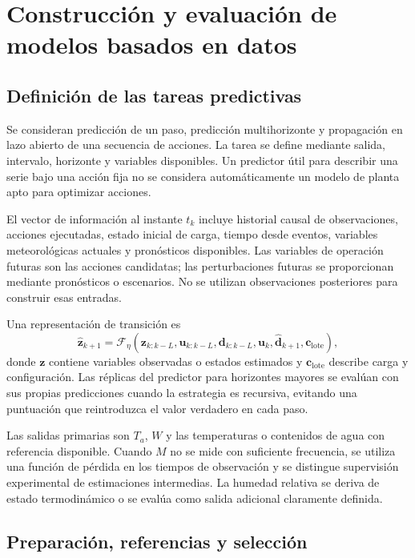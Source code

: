 \section{Construcción y evaluación de modelos basados en datos}
\label{met:ml}

\subsection{Definición de las tareas predictivas}

Se consideran predicción de un paso, predicción multihorizonte y propagación en lazo abierto de una secuencia de acciones. La tarea se define mediante salida, intervalo, horizonte y variables disponibles. Un predictor útil para describir una serie bajo una acción fija no se considera automáticamente un modelo de planta apto para optimizar acciones.

El vector de información al instante $t_k$ incluye historial causal de observaciones, acciones ejecutadas, estado inicial de carga, tiempo desde eventos, variables meteorológicas actuales y pronósticos disponibles. Las variables de operación futuras son las acciones candidatas; las perturbaciones futuras se proporcionan mediante pronósticos o escenarios. No se utilizan observaciones posteriores para construir esas entradas.

Una representación de transición es
\begin{equation}
\widehat{\mathbf z}_{k+1}
=\mathcal F_\eta\left(
\mathbf z_{k:k-L},\mathbf u_{k:k-L},
\mathbf d_{k:k-L},\mathbf u_k,\widehat{\mathbf d}_{k+1},
\mathbf c_{\mathrm{lote}}
\right),
\label{met:predictor_dinamico}
\end{equation}
donde $\mathbf z$ contiene variables observadas o estados estimados y $\mathbf c_{\mathrm{lote}}$ describe carga y configuración. Las réplicas del predictor para horizontes mayores se evalúan con sus propias predicciones cuando la estrategia es recursiva, evitando una puntuación que reintroduzca el valor verdadero en cada paso.

Las salidas primarias son $T_a$, $W$ y las temperaturas o contenidos de agua con referencia disponible. Cuando $M$ no se mide con suficiente frecuencia, se utiliza una función de pérdida en los tiempos de observación y se distingue supervisión experimental de estimaciones intermedias. La humedad relativa se deriva de estado termodinámico o se evalúa como salida adicional claramente definida.

\subsection{Preparación, referencias y selección}

